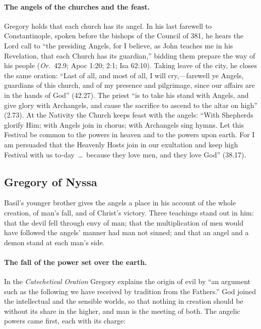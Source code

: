 \paragraph{The angels of the churches and the feast.} Gregory holds that
each church has its angel. In his last farewell to Constantinople, spoken
before the bishops of the Council of 381, he hears the Lord call to
``the presiding Angels, for I believe, as John teaches me in his
Revelation, that each Church has its guardian,'' bidding them prepare the
way of his people (\emph{Or.}\ 42.9; Apoc 1:20; 2:1; Isa 62:10). Taking leave of
the city, he closes the same oration: ``Last of all, and most of all, I will
cry,---farewell ye Angels, guardians of this church, and of my presence and
pilgrimage, since our affairs are in the hands of God'' (42.27). The
priest ``is to take his stand with Angels, and give glory with
Archangels, and cause the sacrifice to ascend to the altar on high''
(2.73). At the Nativity the Church keeps feast with the angels: ``With
Shepherds glorify Him; with Angels join in chorus; with Archangels sing
hymns. Let this Festival be common to the powers in heaven and to the
powers upon earth. For I am persuaded that the Heavenly Hosts join in our
exultation and keep high Festival with us to-day~\dots\ because they love
men, and they love God'' (38.17).

\sectionguard
\subsection{Gregory of Nyssa}\label{sec:fb-nyssa}

Basil's younger brother gives the angels a place in his account of the
whole creation, of man's fall, and of Christ's victory. Three teachings
stand out in him: that the devil fell through envy of man; that the
multiplication of men would have followed the angels' manner had man not
sinned; and that an angel and a demon stand at each man's side.

\paragraph{The fall of the power set over the earth.} In the
\emph{Catechetical Oration} Gregory explains the origin of evil by ``an
argument such as the following we have received by tradition from the
Fathers.'' God joined the intellectual and the sensible worlds, so that
nothing in creation should be without its share in the higher, and man is
the meeting of both. The angelic powers came first, each with its
charge:


